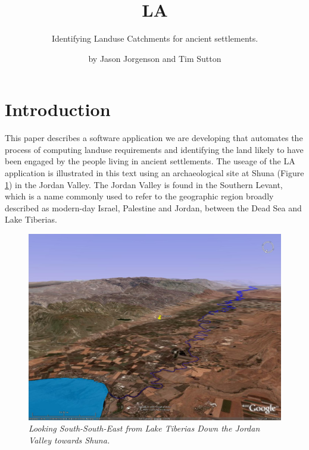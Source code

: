 

\title{LA} \subtitle{Identifying Landuse Catchments for 
ancient settlements.}

\author{by Jason Jorgenson and Tim Sutton}

\maketitle

\section{Introduction} \label{sec:Introduction}
  This paper describes a software application we are developing that automates
  the process of computing landuse requirements and identifying the land likely 
  to have been engaged by the people living in ancient settlements.
  The useage of the LA application is illustrated in this text using an
  archaeological site at Shuna (Figure \ref{fig:shunaGoogleEarth}) in the
  Jordan Valley.  The Jordan Valley is found in the Southern Levant, which is a name
  commonly used to refer to the geographic region broadly described as
  modern-day Israel, Palestine and Jordan, between the Dead Sea and Lake Tiberias.

\begin{figure}[htbp] %
  \includegraphics[scale=0.17]{./images/ShunaGoogleEarth3D.jpg}
  \caption{\label{fig:shunaGoogleEarth}\textit{Looking South-South-East from Lake
    Tiberias Down the Jordan Valley towards Shuna.}} 
\end{figure}

